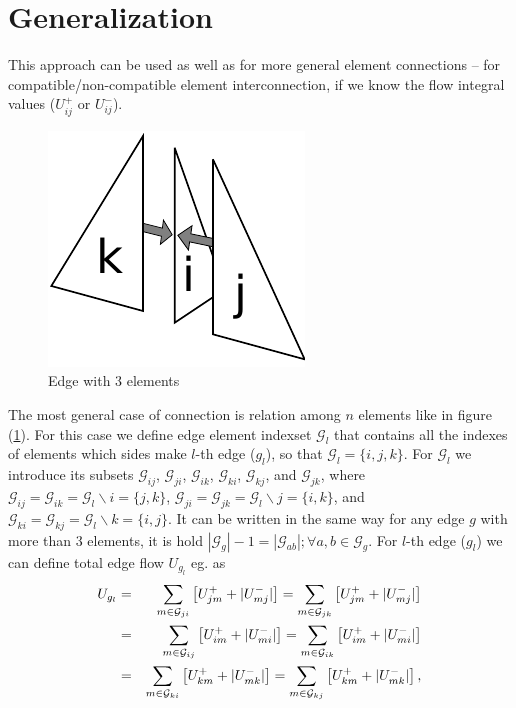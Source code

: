  \section*{Generalization}
  This approach can be used as well as for more general element connections -- for compatible/non-compatible element interconnection, if we know the flow integral
  values ($U_{ij}^{+}$ or $U_{ij}^{-}$). %
      \begin{figure}[h]
        \begin{center}
        \includegraphics[scale=0.7]{obr7.pdf} 
	\caption{Edge with 3 elements}
	\label{edgemodel}
        \end{center}
      \end{figure}  
  The most general case of connection is relation among $n$ elements like in figure (\ref{edgemodel}). For this case we define
edge element indexset $\mathcal{G}_{l}$ that contains all the indexes of elements which sides make $l$-th edge ($g_l$), so that $\mathcal{G}_{l} = \{i,j,k\}$.
For $\mathcal{G}_{l}$ we introduce its subsets $\mathcal{G}_{ij}$, $\mathcal{G}_{ji}$, $\mathcal{G}_{ik}$, $\mathcal{G}_{ki}$, $\mathcal{G}_{kj}$, and $\mathcal{G}_{jk}$,
  where $\mathcal{G}_{ij} = \mathcal{G}_{ik} =  \mathcal{G}_{l} \backslash {i} = \{j,k\}$, $ \mathcal{G}_{ji} = \mathcal{G}_{jk} = \mathcal{G}_{l} \backslash {j} =\{i,k\}$, and
 $\mathcal{G}_{ki} = \mathcal{G}_{kj} = \mathcal{G}_{l} \backslash {k} =\{i,j\}$. It can be written in the same way for any edge $g$ with more than 3 elements, 
it is hold  $|\mathcal{G}_{g}| - 1 = |\mathcal{G}_{ab}|; \forall a,b \in \mathcal{G}_{g}$.
For $l$-th edge ($g_l$) we can define total edge flow $U_{g_{l}}$ eg. as
  \begin{eqnarray}
   U_{g_{l}} &=& \sum\limits_{m \in \mathcal{G}_{ji}}  \left[ U_{jm}^{+} + | U_{mj}^{-}| \right] = \sum\limits_{m \in \mathcal{G}_{jk}}  \left[ U_{jm}^{+} + | U_{mj}^{-}| \right] \notag \\
	      &=& \sum\limits_{m \in \mathcal{G}_{ij}}  \left[ U_{im}^{+} + | U_{mi}^{-}| \right] = \sum\limits_{m \in \mathcal{G}_{ik}}  \left[ U_{im}^{+} + | U_{mi}^{-}| \right] \notag \\ 
	      &=& \sum\limits_{m \in \mathcal{G}_{ki}}  \left[ U_{km}^{+} + | U_{mk}^{-}| \right] = \sum\limits_{m \in \mathcal{G}_{kj}}  \left[ U_{km}^{+} + | U_{mk}^{-}| \right], \label{edgeflow} 
  \end{eqnarray}

